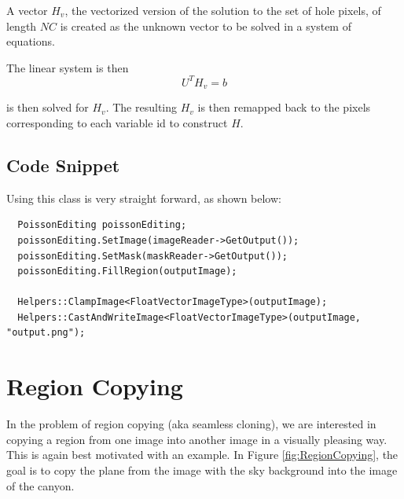 \documentclass{InsightArticle}
\begin{document}
A vector $H_v$, the vectorized version of the solution to the set of hole pixels, of length $NC$ is created as the unknown vector to be solved in a system of equations.

The linear system is then
\begin{equation}
 U^T H_v = b
\end{equation}

is then solved for $H_v$. The resulting $H_v$ is then remapped back to the pixels corresponding to each variable id to construct $H$.

\subsection{Code Snippet}

Using this class is very straight forward, as shown below:

\begin{verbatim}
  PoissonEditing poissonEditing;
  poissonEditing.SetImage(imageReader->GetOutput());
  poissonEditing.SetMask(maskReader->GetOutput());
  poissonEditing.FillRegion(outputImage);

  Helpers::ClampImage<FloatVectorImageType>(outputImage);
  Helpers::CastAndWriteImage<FloatVectorImageType>(outputImage, "output.png");
\end{verbatim}


\section{Region Copying}
In the problem of region copying (aka seamless cloning), we are interested in copying a region from one image into another image in a visually pleasing way. This is again best motivated with an example. In Figure \ref{fig:RegionCopying}, the goal is to copy the plane from the image with the sky background into the image of the canyon. 
\end{document}
